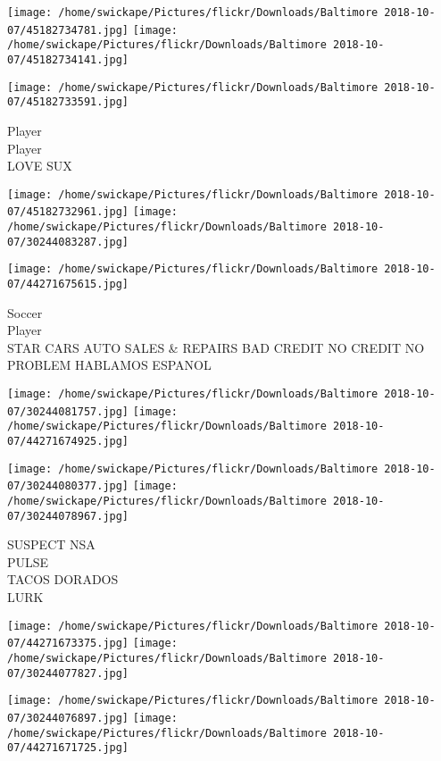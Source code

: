 \documentclass[10pt,letterpaper]{article}
\begin{document}
\texttt{[image: /home/swickape/Pictures/flickr/Downloads/Baltimore 2018-10-07/45182734781.jpg]}
\texttt{[image: /home/swickape/Pictures/flickr/Downloads/Baltimore 2018-10-07/45182734141.jpg]}

\vspace{0.25in}
\texttt{[image: /home/swickape/Pictures/flickr/Downloads/Baltimore 2018-10-07/45182733591.jpg]}

Player\\
Player\\
LOVE SUX\\
\pagebreak

\texttt{[image: /home/swickape/Pictures/flickr/Downloads/Baltimore 2018-10-07/45182732961.jpg]}
\texttt{[image: /home/swickape/Pictures/flickr/Downloads/Baltimore 2018-10-07/30244083287.jpg]}

\vspace{0.25in}
\texttt{[image: /home/swickape/Pictures/flickr/Downloads/Baltimore 2018-10-07/44271675615.jpg]}

Soccer\\
Player\\
STAR CARS AUTO SALES \& REPAIRS BAD CREDIT NO CREDIT NO PROBLEM HABLAMOS ESPANOL\\
\pagebreak

\texttt{[image: /home/swickape/Pictures/flickr/Downloads/Baltimore 2018-10-07/30244081757.jpg]}
\texttt{[image: /home/swickape/Pictures/flickr/Downloads/Baltimore 2018-10-07/44271674925.jpg]}

\texttt{[image: /home/swickape/Pictures/flickr/Downloads/Baltimore 2018-10-07/30244080377.jpg]}
\texttt{[image: /home/swickape/Pictures/flickr/Downloads/Baltimore 2018-10-07/30244078967.jpg]}

SUSPECT NSA\\
PULSE\\
TACOS DORADOS\\
LURK\\
\pagebreak

\texttt{[image: /home/swickape/Pictures/flickr/Downloads/Baltimore 2018-10-07/44271673375.jpg]}
\texttt{[image: /home/swickape/Pictures/flickr/Downloads/Baltimore 2018-10-07/30244077827.jpg]}

\texttt{[image: /home/swickape/Pictures/flickr/Downloads/Baltimore 2018-10-07/30244076897.jpg]}
\texttt{[image: /home/swickape/Pictures/flickr/Downloads/Baltimore 2018-10-07/44271671725.jpg]}
\end{document}
